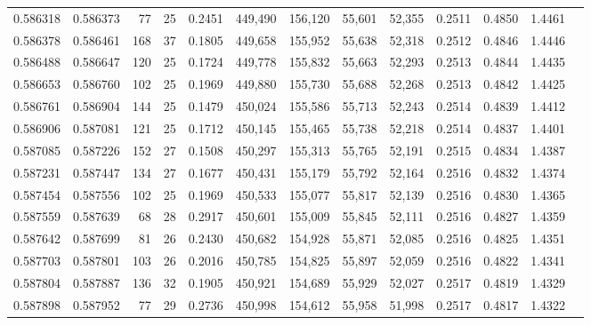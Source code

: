 \begin{tabular}{rrrrrrrrrrrrr}
0.586318 & 0.586373 &    77 &  25 &                                     0.2451 & 449,490 & 156,120 &  55,601 &  52,355 & 0.2511 & 0.4850 & 1.4461 \\
0.586378 & 0.586461 &   168 &  37 &                                     0.1805 & 449,658 & 155,952 &  55,638 &  52,318 & 0.2512 & 0.4846 & 1.4446 \\
0.586488 & 0.586647 &   120 &  25 &                                     0.1724 & 449,778 & 155,832 &  55,663 &  52,293 & 0.2513 & 0.4844 & 1.4435 \\
0.586653 & 0.586760 &   102 &  25 &                                     0.1969 & 449,880 & 155,730 &  55,688 &  52,268 & 0.2513 & 0.4842 & 1.4425 \\
0.586761 & 0.586904 &   144 &  25 &                                     0.1479 & 450,024 & 155,586 &  55,713 &  52,243 & 0.2514 & 0.4839 & 1.4412 \\
0.586906 & 0.587081 &   121 &  25 &                                     0.1712 & 450,145 & 155,465 &  55,738 &  52,218 & 0.2514 & 0.4837 & 1.4401 \\
0.587085 & 0.587226 &   152 &  27 &                                     0.1508 & 450,297 & 155,313 &  55,765 &  52,191 & 0.2515 & 0.4834 & 1.4387 \\
0.587231 & 0.587447 &   134 &  27 &                                     0.1677 & 450,431 & 155,179 &  55,792 &  52,164 & 0.2516 & 0.4832 & 1.4374 \\
0.587454 & 0.587556 &   102 &  25 &                                     0.1969 & 450,533 & 155,077 &  55,817 &  52,139 & 0.2516 & 0.4830 & 1.4365 \\
0.587559 & 0.587639 &    68 &  28 &                                     0.2917 & 450,601 & 155,009 &  55,845 &  52,111 & 0.2516 & 0.4827 & 1.4359 \\
0.587642 & 0.587699 &    81 &  26 &                                     0.2430 & 450,682 & 154,928 &  55,871 &  52,085 & 0.2516 & 0.4825 & 1.4351 \\
0.587703 & 0.587801 &   103 &  26 &                                     0.2016 & 450,785 & 154,825 &  55,897 &  52,059 & 0.2516 & 0.4822 & 1.4341 \\
0.587804 & 0.587887 &   136 &  32 &                                     0.1905 & 450,921 & 154,689 &  55,929 &  52,027 & 0.2517 & 0.4819 & 1.4329 \\
0.587898 & 0.587952 &    77 &  29 &                                     0.2736 & 450,998 & 154,612 &  55,958 &  51,998 & 0.2517 & 0.4817 & 1.4322 \\

\end{tabular}
